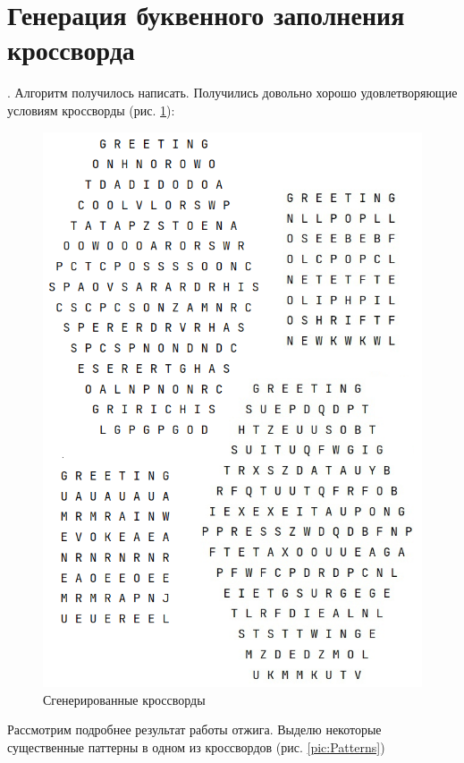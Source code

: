 \documentclass[12pt]{report}
\begin{document}
\section{Генерация буквенного заполнения кроссворда}. 
Алгоритм получилось написать. Получились довольно хорошо удовлетворяющие условиям кроссворды (рис. \ref{pic:GenCross}):
\begin{figure}[ht!]
 \centering
    \includegraphics[scale=1.0]{generated8.PNG}
    \caption{\label{pic:GenCross}Сгенерированные кроссворды}
\end{figure}
Рассмотрим подробнее результат работы отжига. Выделю некоторые существенные паттерны в одном из кроссвордов (рис. \ref{pic:Patterns})
\end{document}
